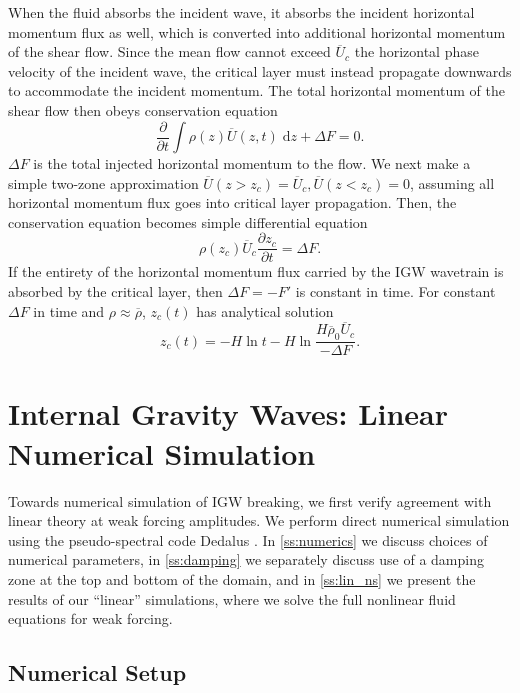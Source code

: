 \documentclass[
        fleqn,
        usenatbib,
    ]{mnras}
\newcommand*{\pd}[2]{\frac{\partial#1}{\partial#2}}
\begin{document}
When the fluid absorbs the incident wave, it absorbs the incident horizontal
momentum flux as well, which is converted into additional horizontal momentum of
the shear flow. Since the mean flow cannot exceed $\overline{U}_c$ the
horizontal phase velocity of the incident wave, the critical layer must instead
propagate downwards to accommodate the incident momentum. The total horizontal
momentum of the shear flow then obeys conservation equation
\begin{equation}
    \pd{}{t}\int\limits \rho(z) \overline{U}(z, t)\;\mathrm{d}z
        + \Delta F = 0.
\end{equation}
$\Delta F$ is the total injected horizontal momentum to the flow. We next make a
simple two-zone approximation $\overline{U}(z > z_c) = \overline{U}_c,
\overline{U}(z < z_c) = 0$, assuming all horizontal momentum flux goes into
critical layer propagation. Then, the conservation equation becomes simple
differential equation
\begin{equation}
    \rho(z_c) \overline{U}_c\pd{z_c}{t} = \Delta F.\label{eq:zc_anal}
\end{equation}
If the entirety of the horizontal momentum flux carried by the IGW wavetrain is
absorbed by the critical layer, then $\Delta F = -F'$ is constant in time.
For constant $\Delta F$ in time and $\rho \approx \overline{\rho}$, $z_c(t)$ has
analytical solution
\begin{equation}
    z_c(t) = -H\ln t - H\ln \frac{H\overline{\rho}_0\overline{U}_c}{-\Delta F}
        .\label{eq:zc_sol}
\end{equation}

\section{Internal Gravity Waves: Linear Numerical Simulation}\label{s:sim}

Towards numerical simulation of IGW breaking, we first verify agreement with
linear theory at weak forcing amplitudes. We perform direct numerical simulation
using the pseudo-spectral code Dedalus \citep{dedalus}. In \autoref{ss:numerics}
we discuss choices of numerical parameters, in \autoref{ss:damping} we
separately discuss use of a damping zone at the top and bottom of the domain,
and in \autoref{ss:lin_ns} we present the results of our ``linear'' simulations,
where we solve the full nonlinear fluid equations for weak forcing.

\subsection{Numerical Setup}\label{ss:numerics}
\end{document}
